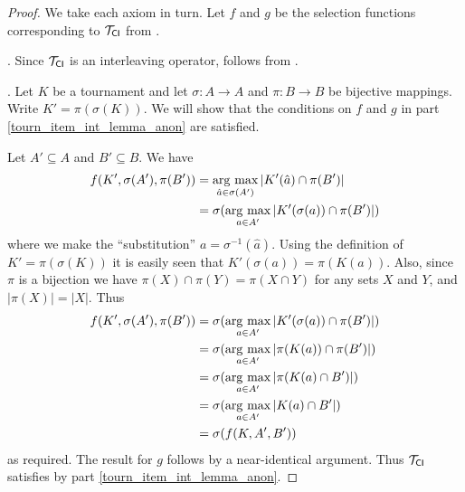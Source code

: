 \begin{proof}

    We take each axiom in turn. Let $f$ and $g$ be the selection functions
    corresponding to ${\mathcal{T}_{\mathsf{CI}}}$ from .

    \chaindef{}. Since ${\mathcal{T}_{\mathsf{CI}}}$ is an interleaving operator,
    \chaindef{} follows from .

    \anon{}. Let $K$ be a tournament and let $\sigma: A \to A$ and $\pi:
    B \to B$ be bijective mappings. Write $K' = \pi(\sigma(K))$. We will show
    that the conditions on $f$ and $g$ in
     part
    \cref{tourn_item_int_lemma_anon} are satisfied.

    Let $A' \subseteq A$ and $B' \subseteq B$. We have
    \begin{align*}
        f(K', \sigma(A'), \pi(B'))
        &= \operatorname*{arg\ max}_{\hat{a} \in \sigma(A')}{|K'(\hat{a}) \cap \pi(B')|} \\
        &= \sigma(\operatorname*{arg\ max}_{a \in A'}{|K'(\sigma(a)) \cap \pi(B')|})
    \end{align*}
    where we make the ``substitution'' $a = \sigma^{-1}(\hat{a})$. Using the
    definition of $K' = \pi(\sigma(K))$ it is easily seen that $K'(\sigma(a)) =
    \pi(K(a))$. Also, since $\pi$ is a bijection we have $\pi(X) \cap \pi(Y) =
    \pi(X \cap Y)$ for any sets $X$ and $Y$, and $|\pi(X)| = |X|$. Thus
    \begin{align*}
        f(K', \sigma(A'), \pi(B'))
        &= \sigma(\operatorname*{arg\ max}_{a \in A'}{|K'(\sigma(a)) \cap \pi(B')|}) \\
        &= \sigma(\operatorname*{arg\ max}_{a \in A'}{|\pi(K(a)) \cap \pi(B')|}) \\
        &= \sigma(\operatorname*{arg\ max}_{a \in A'}{|\pi(K(a) \cap B')|}) \\
        &= \sigma(\operatorname*{arg\ max}_{a \in A'}{|K(a) \cap B'|}) \\
        &= \sigma(f(K, A', B'))
    \end{align*}
    as required. The result for $g$ follows by a near-identical argument. Thus
    ${\mathcal{T}_{\mathsf{CI}}}$ satisfies \anon{} by
     part
    \cref{tourn_item_int_lemma_anon}.


\end{proof}
